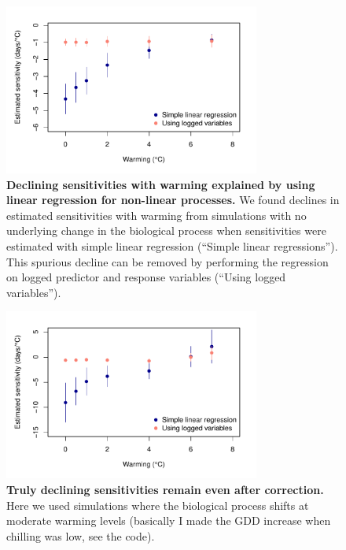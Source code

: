 \documentclass[11pt,letter]{article}
\begin{document}
\begin{figure}[h!]
\centering
\noindent \includegraphics[width=0.75\textwidth]{..//analyses/figures/basicsims.pdf}
\caption{\textbf{Declining sensitivities with warming explained by using linear regression for non-linear processes.} We found declines in estimated sensitivities with warming from simulations with no underlying change in the biological process when sensitivities were estimated with simple linear regression (``Simple linear regressions''). This spurious decline can be removed by performing the regression on logged predictor and response variables (``Using logged variables'').}
\label{fig:basicsims} %
\end{figure}


\begin{figure}[h!]
\centering
\noindent \includegraphics[width=0.75\textwidth]{..//analyses/figures/shiftingcuessims.pdf}
\caption{\textbf{Truly declining sensitivities remain even after correction.} Here we used simulations where the biological process shifts at moderate warming levels (basically I made the GDD increase when chilling was low, see the code). }
\label{fig:biosims} %
\end{figure}
\end{document}
